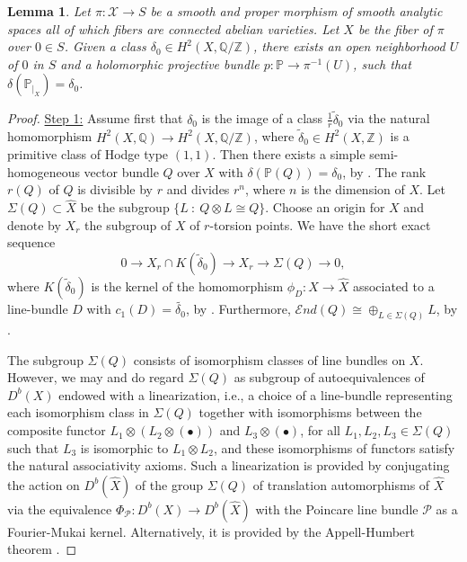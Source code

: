\documentclass[12pt]{amsart}
\numberwithin{equation}{subsection}
\theoremstyle{plain}
\newtheorem{lem}[thm]{Lemma}
\theoremstyle{definition}
\newcommand{\QQ}{{\mathbb Q}}
\newcommand{\X}{{\mathcal X}}
\newcommand{\ZZ}{{\mathbb Z}}
\renewcommand{\P}{{\mathcal P}}
\newcommand{\PP}{{\mathbb P}}
\newcommand{\restricted}[2]{#1_{\mid_{#2}}}
\newcommand{\SheafEnd}{{\mathcal E}nd}
\begin{document}
\begin{lem}
\label{lemma-deforming-semihomogeneous-vb}
Let $\pi:\X\rightarrow S$ be a smooth and proper morphism of smooth analytic spaces all of which fibers are connected abelian varieties. Let $X$ be the fiber of $\pi$ over $0\in S$. 
Given a class $\delta_0\in H^2(X,\QQ/\ZZ)$, there exists an open neighborhood $U$ of $0$ in $S$ and a holomorphic projective bundle $p:\PP\rightarrow \pi^{-1}(U)$,
such that $\delta(\restricted{\PP}{X})=\delta_0$.
\end{lem}

\begin{proof}
\underline{Step 1:}
Assume first that $\delta_0$ is the image of a class $\frac{1}{r}\tilde{\delta}_0$ via the natural homomorphism
$H^2(X,\QQ)\rightarrow H^2(X,\QQ/\ZZ)$, 
where $\tilde{\delta}_0\in H^2(X,\ZZ)$ is a primitive class of Hodge type $(1,1)$. Then there exists a simple semi-homogeneous vector bundle $Q$ over $X$ with $\delta(\PP(Q))=\delta_0$,
by \cite[Theorem 7.11(1)]{mukai-semihomogeneous}. The rank $r(Q)$ of $Q$ is divisible by $r$ and divides $r^n$, where $n$ is the dimension of $X$.
Let $\Sigma(Q)\subset \hat{X}$ be the subgroup $\{L \ : \ Q\otimes L\cong Q\}$. 
Choose an origin for $X$ and denote by $X_r$ the subgroup of $X$ of $r$-torsion points. We have the short exact sequence
\[
0\rightarrow X_r\cap K(\tilde{\delta}_0)\rightarrow X_r\rightarrow \Sigma(Q)\rightarrow 0,
\]
where $K(\tilde{\delta}_0)$ is the kernel of the homomorphism $\phi_D:X\rightarrow \hat{X}$ associated to a line-bundle $D$ with $c_1(D)=\tilde{\delta_0}$,
by \cite[Theorem 7.11(4)]{mukai-semihomogeneous}.
Furthermore, $\SheafEnd(Q)\cong \oplus_{L\in\Sigma(Q)}L$, by \cite[Proposition 7.1]{mukai-semihomogeneous}.

The subgroup $\Sigma(Q)$ consists of isomorphism classes of line bundles on $X$. However,
we may and do regard $\Sigma(Q)$ as subgroup of autoequivalences of $D^b(X)$ endowed with a linearization, i.e., a choice of a line-bundle representing each isomorphism class in $\Sigma(Q)$ together with isomorphisms between
the composite functor $L_1\otimes (L_2\otimes(\bullet))$ and $L_3\otimes (\bullet)$, for all $L_1, L_2, L_3\in \Sigma(Q)$ such that $L_3$ is isomorphic to $L_1\otimes L_2$, and these isomorphisms of functors satisfy the natural associativity axioms. Such a linearization is provided by conjugating the action on $D^b(\hat{X})$ of the group $\Sigma(Q)$ of translation automorphisms of $\hat{X}$ via the equivalence $\Phi_\P:D^b(X)\rightarrow D^b(\hat{X})$ with the Poincare line bundle $\P$ as a Fourier-Mukai kernel. Alternatively, it is provided by the Appell-Humbert theorem \cite[Theorem 2.2.3]{BL}.


\end{proof}
\end{document}

